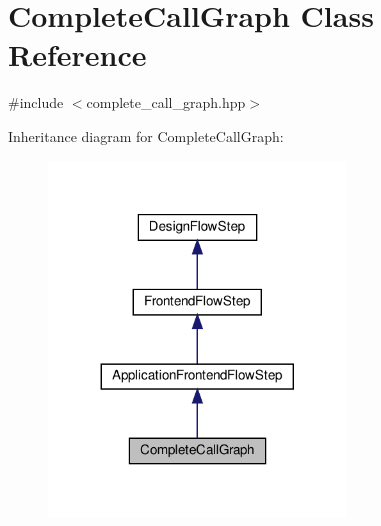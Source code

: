 \hypertarget{classCompleteCallGraph}{}\section{Complete\+Call\+Graph Class Reference}
\label{classCompleteCallGraph}


{\ttfamily \#include $<$complete\+\_\+call\+\_\+graph.\+hpp$>$}



Inheritance diagram for Complete\+Call\+Graph\+:
\nopagebreak
\begin{figure}[H]
\begin{center}
\leavevmode
\includegraphics[width=224pt]{d1/d3c/classCompleteCallGraph__inherit__graph}
\end{center}
\end{figure}


